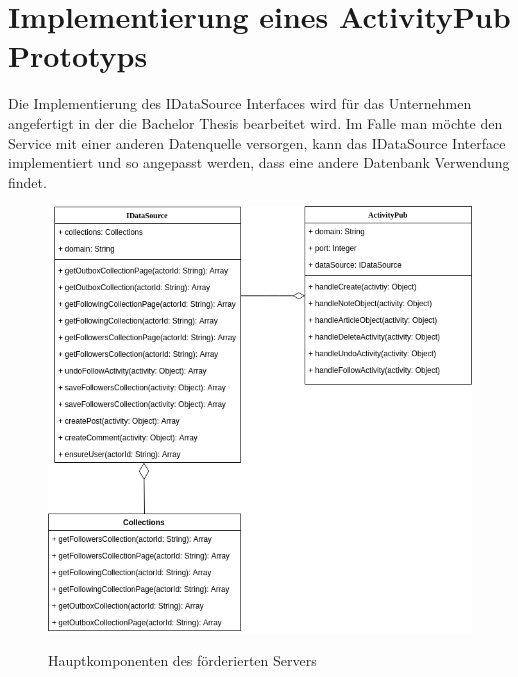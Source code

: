 
\chapter{Implementierung eines ActivityPub Prototyps}
Die Implementierung des IDataSource Interfaces wird für das Unternehmen angefertigt in der die Bachelor Thesis bearbeitet wird. Im Falle man möchte den Service mit einer anderen Datenquelle versorgen, kann das IDataSource Interface implementiert und so angepasst werden, dass eine andere Datenbank Verwendung findet.\\

\begin{figure}[h]
	\begin{minipage}{\textwidth}
		\centering
		\includegraphics[scale=0.5]{figures/klassendiagramm-activitypub.png}
		\label{klassendiagramm-activitypub}
		\caption{Hauptkomponenten des förderierten Servers}
	\end{minipage}
\end{figure}

